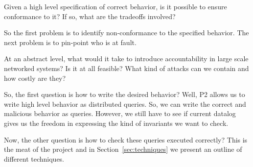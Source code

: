  
 
 
Given a high level specification of correct behavior, is it possible 
to ensure conformance to it? If so, what are the tradeoffs involved? 
 
So the first problem is to identify non-conformance to the specified 
behavior. The next problem is to pin-point who is at fault. 
 
At an abstract level, what would it take to introduce accountability 
in large scale networked systems? Is it at all feasible? What kind of 
attacks can we contain and how costly are they? 
 
So, the first question is how to write the desired behavior? Well, P2 
allows us to write high level behavior as distributed queries. So, we 
can write the correct and malicious behavior as queries. However, we 
still have to see if current datalog gives us the freedom in 
expressing the kind of invariants we want to check. 
 
Now, the other question is how to check these queries executed 
correctly? This is the meat of the project and in 
Section~\ref{sec:techniques} we present an outline of different 
techniques.  
\fi 
 
